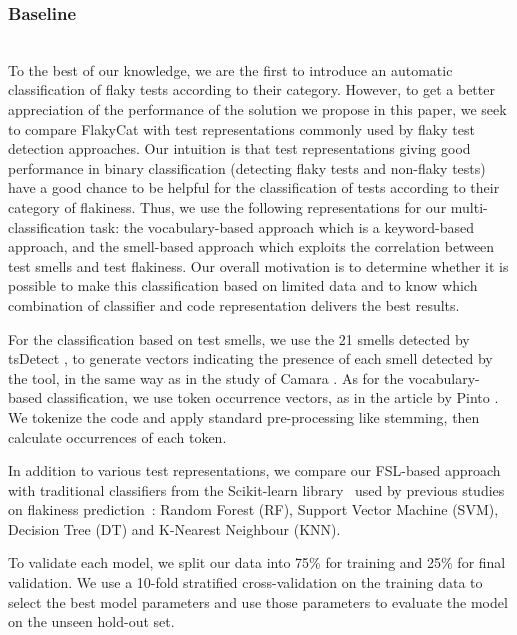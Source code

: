 \subsubsection{Baseline}
~~ \\
To the best of our knowledge, we are the first to introduce an automatic classification of flaky tests according to their category.
However, to get a better appreciation of the performance of the solution we propose in this paper, we seek to compare FlakyCat with test representations commonly used by flaky test detection approaches. Our intuition is that test representations giving good performance in binary classification (\ie detecting flaky tests and non-flaky tests) have a good chance to be helpful for the classification of tests according to their category of flakiness. Thus, we use the following representations for our multi-classification task: the vocabulary-based approach \cite{Pinto2020} which is a keyword-based approach, and the smell-based approach \cite{camara2021use} which exploits the correlation between test smells and test flakiness. Our overall motivation is to determine whether it is possible to make this classification based on limited data and to know which combination of classifier and code representation delivers the best results. 

For the classification based on test smells, we use the 21 smells detected by tsDetect \cite{tsdetect}, to generate vectors indicating the presence of each smell detected by the tool, in the same way as in the study of Camara \etal \cite{camara2021use}. As for the vocabulary-based classification, we use token occurrence vectors, as in the article by Pinto \etal \cite{Pinto2020}. We tokenize the code and apply standard pre-processing like stemming, then calculate occurrences of each token.

In addition to various test representations, we compare our FSL-based approach with traditional classifiers from the Scikit-learn library~\cite{pedregosa2011scikit} used by previous studies on flakiness prediction~\cite{Pinto2020,camara2021use,Camara2021VocabExtendedReplication}: Random Forest (RF), Support Vector Machine (SVM), Decision Tree (DT) and K-Nearest Neighbour (KNN). 

To validate each model, we split our data into 75\% for training and 25\% for final validation. We use a 10-fold stratified cross-validation on the training data to select the best model parameters and use those parameters to evaluate the model on the unseen hold-out set.

